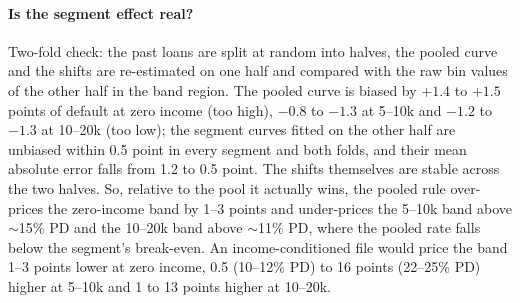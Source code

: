 \documentclass[11pt,a4paper]{article}
\newcommand{\code}[1]{\texttt{#1}}
\begin{document}
\begin{table}[h]\centering\small
{}
\caption{The selected default rate and the adjusted break-even by income segment, from the fitted curves
(\code{output/round1/curse\_floor\_by\_segment.csv}); ``pooled'' is the curve used in the submitted file.}
\label{tab:seg}
\end{table}

\paragraph{Is the segment effect real?} Two-fold check: the past loans are split at random into halves, the pooled curve
and the shifts are re-estimated on one half and compared with the raw bin values of the other half in the band region. The
pooled curve is biased by $+1.4$ to $+1.5$ points of default at zero income (too high), $-0.8$ to $-1.3$ at 5--10k and
$-1.2$ to $-1.3$ at 10--20k (too low); the segment curves fitted on the other half are unbiased within 0.5 point in every
segment and both folds, and their mean absolute error falls from 1.2 to 0.5 point. The shifts themselves are stable across
the two halves. So, relative to the pool it actually wins, the pooled rule over-prices the zero-income band by 1--3 points
and under-prices the 5--10k band above $\sim$15\% PD and the 10--20k band above $\sim$11\% PD, where the pooled rate falls
below the segment's break-even. An income-conditioned file would price the band 1--3 points lower at zero income, 0.5
(10--12\% PD) to 16 points (22--25\% PD) higher at 5--10k and 1 to 13 points higher at 10--20k.
\end{document}
